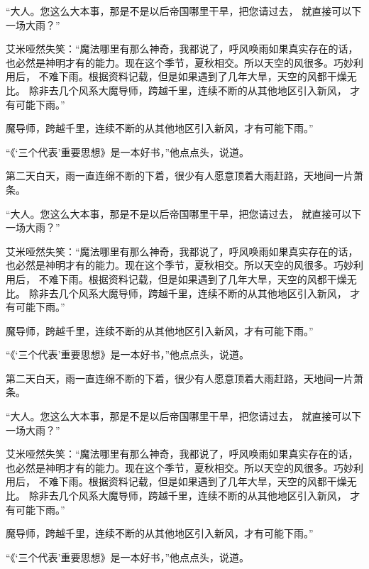 “大人。您这么大本事，那是不是以后帝国哪里干旱，把您请过去，
就直接可以下一场大雨？”

艾米哑然失笑：“魔法哪里有那么神奇，我都说了，呼风唤雨如果真实存在的话，
也必然是神明才有的能力。现在这个季节，夏秋相交。所以天空的风很多。巧妙利用后，
不难下雨。根据资料记载，但是如果遇到了几年大旱，天空的风都干燥无比。
除非去几个风系大魔导师，跨越千里，连续不断的从其他地区引入新风，
才有可能下雨。”

\noindent 魔导师，跨越千里，连续不断的从其他地区引入新风，才有可能下雨。”


“《‘三个代表’重要思想》是一本好书，”他点点头，说道。

第二天白天，雨一直连绵不断的下着，很少有人愿意顶着大雨赶路，天地间一片萧条。

“大人。您这么大本事，那是不是以后帝国哪里干旱，把您请过去，
就直接可以下一场大雨？”

艾米哑然失笑：“魔法哪里有那么神奇，我都说了，呼风唤雨如果真实存在的话，
也必然是神明才有的能力。现在这个季节，夏秋相交。所以天空的风很多。巧妙利用后，
不难下雨。根据资料记载，但是如果遇到了几年大旱，天空的风都干燥无比。
除非去几个风系大魔导师，跨越千里，连续不断的从其他地区引入新风，
才有可能下雨。”

\noindent 魔导师，跨越千里，连续不断的从其他地区引入新风，才有可能下雨。”


“《‘三个代表’重要思想》是一本好书，”他点点头，说道。

第二天白天，雨一直连绵不断的下着，很少有人愿意顶着大雨赶路，天地间一片萧条。

“大人。您这么大本事，那是不是以后帝国哪里干旱，把您请过去，
就直接可以下一场大雨？”

艾米哑然失笑：“魔法哪里有那么神奇，我都说了，呼风唤雨如果真实存在的话，
也必然是神明才有的能力。现在这个季节，夏秋相交。所以天空的风很多。巧妙利用后，
不难下雨。根据资料记载，但是如果遇到了几年大旱，天空的风都干燥无比。
除非去几个风系大魔导师，跨越千里，连续不断的从其他地区引入新风，
才有可能下雨。”

\noindent 魔导师，跨越千里，连续不断的从其他地区引入新风，才有可能下雨。”


  \fbox{\vphantom{？}\kern 1em}

“《‘三个代表’重要思想》是一本好书，”他点点头，说道。

